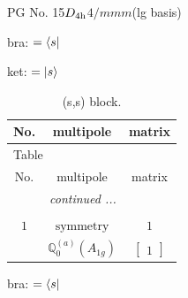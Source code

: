 \documentclass[fleqn,8pt,landscape]{jsarticle}
\begin{document}
\setcounter{MaxMatrixCols}{32}

\renewcommand{\tablename}{Table~}
\renewcommand{\figurename}{Figure~}
\begin{center}
\LARGE
PG No. 15\quad$D_{\rm 4h}$\quad$4/mmm$\quad[ tetragonal ] (lg basis)
\end{center}
bra: $=\bra{s}$

\noindent
ket: $=\ket{s}$
\renewcommand{\arraystretch}{1.6}
\begin{longtable}{ccc}
\caption{(s,s) block.}
 \\
 \hline \hline
No. & multipole & matrix \\ \hline \endfirsthead

\multicolumn{2}{l}{\tablename\ \thetable{}} \\
 \hline \hline
No. & multipole & matrix \\ \hline \endhead

 \hline \hline
\multicolumn{2}{r}{\footnotesize\it continued ...} \\ \endfoot

 \hline \hline
\multicolumn{2}{r}{} \\ \endlastfoot

$ 1 $ & $ \text{symmetry} $ & $ 1 $ \\
$  $ & $ \mathbb{Q}_{0}^{(a)}(A_{1g}) $ & $ \begin{bmatrix} 1 \end{bmatrix} $ \\ \hline
\end{longtable}
bra: $=\bra{s}$
\end{document}
